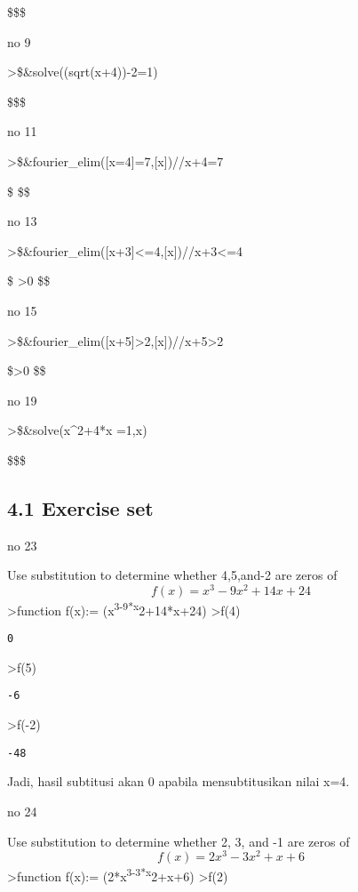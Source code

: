 \documentclass[
]{book}
\begin{document}
\$\left[ x=\frac{13}{6} , x=-1 \right] \$\$

no 9

\textgreater\$\&solve((sqrt(x+4))-2=1)

\$\left[ x=5 \right] \$\$

no 11

\textgreater\$\&fourier\_elim({[}x=4{]}=7,{[}x{]})//x+4=7

\$\left[ \left[ x-7=-3 \right] =0 \right{]} \$\$

no 13

\textgreater\$\&fourier\_elim({[}x+3{]}\textless=4,{[}x{]})//x+3\textless=4

\$\left[ \left[ x-1 \right] =0 \right{]} \lor \left[ \left[ 1-x   \right] \textgreater0 \right{]} \$\$

no 15

\textgreater\$\&fourier\_elim({[}x+5{]}\textgreater2,{[}x{]})//x+5\textgreater2

\$\left[ \left[ x+3 \right] \textgreater0 \right{]} \$\$

no 19

\textgreater\$\&solve(x\^{}2+4*x =1,x)

\$\left[ x=-\sqrt{5}-2 , x=\sqrt{5}-2 \right] \$\$

\subsection{4.1 Exercise set}\label{exercise-set-3}

no 23

Use substitution to determine whether 4,5,and-2 are zeros of\[f(x) = x^3-9x^2+14x+24\]\textgreater function f(x):= (x\textsuperscript{3-9*x}2+14*x+24) \textgreater f(4)

\begin{verbatim}
0
\end{verbatim}

\textgreater f(5)

\begin{verbatim}
-6
\end{verbatim}

\textgreater f(-2)

\begin{verbatim}
-48
\end{verbatim}

Jadi, hasil subtitusi akan 0 apabila mensubtitusikan nilai x=4.

no 24

Use substitution to determine whether 2, 3, and -1 are zeros of\[f(x)=2x^3-3x^2+x+6\]\textgreater function f(x):= (2*x\textsuperscript{3-3*x}2+x+6) \textgreater f(2)
\end{document}
